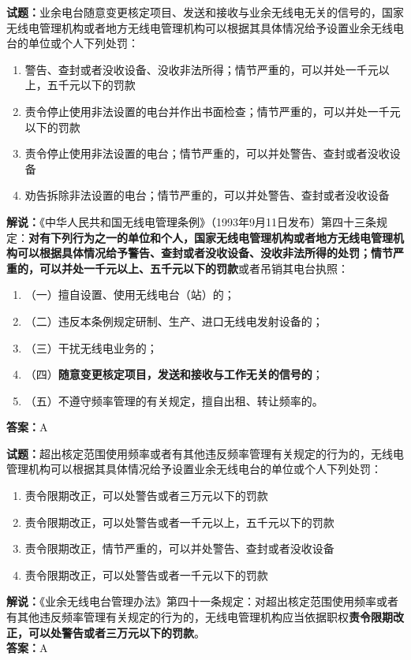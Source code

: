 \documentclass{ctexbook}
\begin{document}
\textbf{试题：}业余电台随意变更核定项目、发送和接收与业余无线电无关的信号的，国家无线电管理机构或者地方无线电管理机构可以根据其具体情况给予设置业余无线电台的单位或个人下列处罚：
\begin{enumerate}[leftmargin=3em]
  \item 警告、查封或者没收设备、没收非法所得；情节严重的，可以并处一千元以上，五千元以下的罚款
  \item 责令停止使用非法设置的电台并作出书面检查；情节严重的，可以并处一千元以下的罚款
  \item 责令停止使用非法设置的电台；情节严重的，可以并处警告、查封或者没收设备
  \item 劝告拆除非法设置的电台；情节严重的，可以并处警告、查封或者没收设备
\end{enumerate}
\noindent\textbf{解说：}《中华人民共和国无线电管理条例》（1993年9月11日发布）第四十三条规定：\textbf{对有下列行为之一的单位和个人，国家无线电管理机构或者地方无线电管理机构可以根据具体情况给予警告、查封或者没收设备、没收非法所得的处罚；情节严重的，可以并处一千元以上、五千元以下的罚款}或者吊销其电台执照：
\begin{enumerate}[leftmargin=3em, label=]
  \item（一）擅自设置、使用无线电台（站）的；
  \item（二）违反本条例规定研制、生产、进口无线电发射设备的；
  \item（三）干扰无线电业务的；
  \item（四）\textbf{随意变更核定项目，发送和接收与工作无关的信号的}；
  \item（五）不遵守频率管理的有关规定，擅自出租、转让频率的。
\end{enumerate}
\textbf{答案：}A

\vspace{1em}

\textbf{试题：}超出核定范围使用频率或者有其他违反频率管理有关规定的行为的，无线电管理机构可以根据其具体情况给予设置业余无线电台的单位或个人下列处罚：
\begin{enumerate}[leftmargin=3em]
  \item 责令限期改正，可以处警告或者三万元以下的罚款
  \item 责令限期改正，可以处警告或者一千元以上，五千元以下的罚款
  \item 责令限期改正，情节严重的，可以并处警告、查封或者没收设备
  \item 责令限期改正，可以处警告或者一千元以下的罚款
\end{enumerate}
\noindent\textbf{解说：}《业余无线电台管理办法》第四十一条规定：对超出核定范围使用频率或者有其他违反频率管理有关规定的行为的，无线电管理机构应当依据职权\textbf{责令限期改正，可以处警告或者三万元以下的罚款}。\\\textbf{答案：}A
\end{document}
